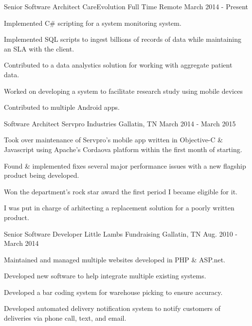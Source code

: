 \begin{cventries}
  \cventry
    {Senior Software Architect}
    {CareEvolution}
    {Full Time Remote}
    {March 2014 - Present}
    {
      \begin{cvitems}
        \item {Implemented C\# scripting for a system monitoring system.}
        \item {Implemented SQL scripts to ingest billions of records of data while maintaining an SLA with the client.}
        \item {Contributed to a data analystics solution for working with aggregate patient data.}
        \item {Worked on developing a system to facilitate research study using mobile devices}
        \item {Contributed to multiple Android apps.}
      \end{cvitems}
    }
  \cventry
    {Software Architect}
    {Servpro Industries}
    {Gallatin, TN}
    {March 2014 - March 2015}
    {
      \begin{cvitems}
        \item {Took over maintenance of Servpro's mobile app written in Objective-C \& Javascript using Apache's Cordaova platform within the first month of starting.}
        \item {Found \& implemented fixes several major performance issues with a new flagship product being developed.}
        \item {Won the department's rock star award the first period I became eligible for it.}
        \item {I was put in charge of arhitecting a replacement solution for a poorly written product.}
      \end{cvitems}
    }
  \cventry
    {Senior Software Developer}
    {Little Lambs Fundraising}
    {Gallatin, TN}
    {Aug. 2010 - March 2014}
    {
      \begin{cvitems}
        \item {Maintained and managed multiple websites developed in PHP \& ASP.net.}
        \item {Developed new software to help integrate multiple existing systems.}
        \item {Developed a bar coding system for warehouse picking to ensure accuracy.}
        \item {Developed automated delivery notification system to notify customers of deliveries via phone call, text, and email.}

\end{cvitems}}
\end{cventries}
